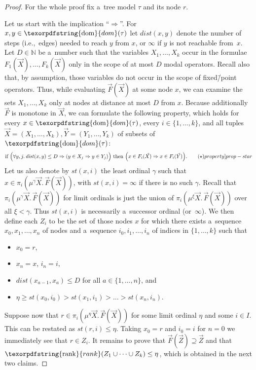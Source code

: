 \documentclass[11pt,a4paper]{amsart}
\theoremstyle{plain}
\theoremstyle{definition}
\theoremstyle{defC}
\theoremstyle{thmC}
\theoremstyle{plain}
\numberwithin{equation}{section}
\numberwithin{equation}{section}
\numberwithin{figure}{section}
\newcommand{\ident}[1]{\ensuremath{\texorpdfstring{\mathrm{\mathnm{#1}}}{#1}}\xspace}
\newcommand{\domain}[1]{\ensuremath{\mathbb{#1}}\xspace}
\newcommand{\N}{\domain{N}}
\newcommand{\dom}{\ident{dom}}
\newcommand{\mathnm}[1]{#1}
\newcommand{\rank}{\ident{rank}}
\newcommand{\dist}{\mathit{dist}}
\newcommand{\stab}{\mathit{st}}
\begin{document}
\begin{proof}
	For the whole proof fix a~tree model $\tau$ and its node $r$.

	Let us start with the implication ``$\Rightarrow$''.
	For $x,y\in\dom(\tau)$ let $\dist(x,y)$ denote the number of steps (i.e.,~edges) needed to reach $y$ from $x$, or $\infty$ if $y$ is not reachable from~$x$.
	Let $D\in\N$ be a~number such that the variables $X_1,\dots,X_k$ occur in the formulae $F_1(\vec{X}),\dots,F_k(\vec{X})$ only in the scope of at most $D$ modal operators.
	Recall also that, by assumption, those variables do not occur in the scope of fixed\=/point operators.
	Thus, while evaluating $\vec{F}(\vec{X})$ at some node $x$, we can examine the sets $X_1,\dots,X_k$ only at nodes at distance at most $D$ from $x$.
	Because additionally $\vec{F}$ is monotone in $\vec{X}$, we can formulate the following property,
	which holds for every $x\in\dom(\tau)$, every $i\in\{1,\dots,k\}$, and all tuples $\vec{X}=(X_1,\dots,X_k),\vec{Y}=(Y_1,\dots,Y_k)$ of subsets of $\dom(\tau)$:
	\begin{align}
		\mbox{if }\Big(\forall y,j.\,\dist(x,y)\leq D\Rightarrow(y\in X_j\Rightarrow y\in Y_j)\Big)
		\mbox{ then }\Big(x\in F_i(\vec{X})\Rightarrow x\in F_i(\vec{Y})\Big).\tag{$\star$}\label[property]{prop-star}
	\end{align}
	Let us also denote by $\stab(x,i)$ the least ordinal $\gamma$ such that $x\in\pi_i(\mu^\gamma\vec{X}.\,\vec{F}(\vec{X}))$, with $\stab(x,i)=\infty$ if there is no such $\gamma$.
	Recall that $\pi_i(\mu^\gamma\vec{X}.\,\vec{F}(\vec{X}))$ for limit ordinals is just the union of $\pi_i(\mu^{\xi}\vec{X}.\,\vec{F}(\vec{X}))$ over all $\xi<\gamma$.
	Thus $\stab(x,i)$ is necessarily a~successor ordinal (or~$\infty$).
	We then define each $Z_i$ to be the set of those nodes $x$ for which there exists a~sequence $x_0,x_1,\dots,x_n$ of nodes and a~sequence $i_0,i_1,\dots,i_n$ of indices in $\{1,\dots,k\}$ such that
	\begin{itemize}
	\item	$x_0=r$,
	\item	$x_n=x$, $i_n=i$,
	\item	$\dist(x_{a-1},x_a)\leq D$ for all $a\in\{1,\dots,n\}$, and
	\item	$\eta\geq\stab(x_0,i_0)>\stab(x_1,i_1)>\dots>\stab(x_n,i_n)$.
	\end{itemize}
	Suppose now that $r\in\pi_i(\mu^\eta\vec{X}.\,\vec{F}(\vec{X}))$ for some limit ordinal $\eta$ and some $i\in I$.
	This can be restated as $\stab(r,i)\leq\eta$.
	Taking $x_0=r$ and $i_0=i$ for $n=0$ we immediately see that $r\in Z_i$.
	It remains to prove that $\vec{F}(\vec{Z})\supseteq\vec{Z}$ and that $\rank(Z_1\cup\dots\cup Z_k)\leq\eta$, which is obtained in the next two claims.


\end{proof}
\end{document}
